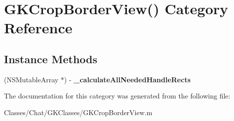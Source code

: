 \hypertarget{category_g_k_crop_border_view_07_08}{}\section{G\+K\+Crop\+Border\+View() Category Reference}
\label{category_g_k_crop_border_view_07_08}
\subsection*{Instance Methods}
\begin{DoxyCompactItemize}
\item 
\hypertarget{category_g_k_crop_border_view_07_08_a23098d3e74affe47afcdbac9f1c661a4}{}(N\+S\+Mutable\+Array $\ast$) -\/ {\bfseries \+\_\+calculate\+All\+Needed\+Handle\+Rects}\label{category_g_k_crop_border_view_07_08_a23098d3e74affe47afcdbac9f1c661a4}

\end{DoxyCompactItemize}


The documentation for this category was generated from the following file\+:\begin{DoxyCompactItemize}
\item 
Classes/\+Chat/\+G\+K\+Classes/G\+K\+Crop\+Border\+View.\+m\end{DoxyCompactItemize}
